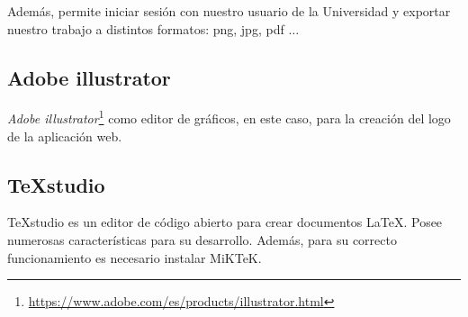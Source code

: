 Además, permite iniciar sesión con nuestro usuario de la Universidad y exportar nuestro trabajo a distintos formatos: png, jpg, pdf $\dots$

\subsection{Adobe illustrator}
\textit{Adobe illustrator}\footnote{\url{https://www.adobe.com/es/products/illustrator.html}} como editor de gráficos, en este caso, para la creación del logo de la aplicación web.

\subsection{TeXstudio}
TeXstudio es un editor de código abierto para crear documentos \LaTeX. Posee numerosas características para su desarrollo. Además, para su correcto funcionamiento es necesario instalar MiKTeK.

